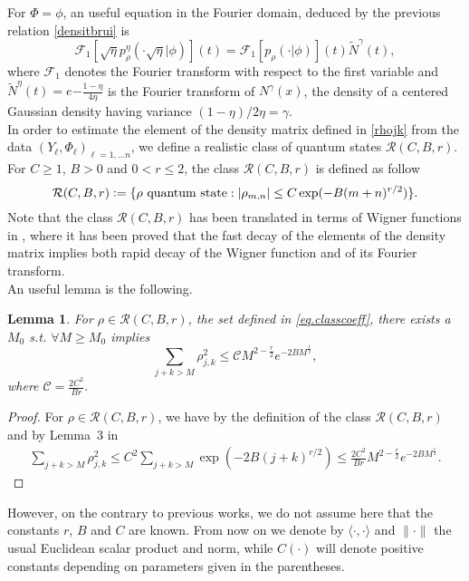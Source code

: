 \documentclass[a4paper]{amsart}
\newtheorem{lemma}{Lemma}[section]
\newcommand{\deq}{\mathrel{\mathop:} = } %
\begin{document}
For $\Phi=\phi$, an useful equation in the Fourier domain, deduced by 
the previous relation \eqref{densitbrui} is
       \begin{equation}
       \label{fourierproun}
       \mathcal{F}_1[\sqrt{\eta}p^\eta_\rho(\cdot\sqrt{\eta}|\phi)](t)
        = \mathcal{F}_1[p_\rho(\cdot|\phi)](t)
        \widetilde{N}^\gamma(t),
       \end{equation}
%       
where $\mathcal{F}_{1} $ denotes the Fourier transform with respect to the first
variable and  $\widetilde{N}^\eta(t)=e{-\frac{1-\eta}{4\eta}}$ is the Fourier
transform of $N^\gamma(x)$, the density of a centered Gaussian density having
variance $(1 -\eta)/2\eta=\gamma$.\\ 

In order  to estimate the element of the density matrix defined in \eqref{rhojk}
from the data  $(Y_{\ell}, \Phi_{\ell})_{\ell=1,\ldots n}$, we define a
realistic class of quantum states $\mathcal{R}(C,B,r)$. For $C\geq 1$, $B>0$ and
$0 < r \leq 2$, the class $\mathcal{R}(C,B,r)$ is defined as follow
%
          \begin{equation}\label{eq.classcoeff}
         \mathcal{R}(C,B,r) \deq \{\rho {\rm \ quantum \ state} :
        |\rho_{m,n} |\leq C \exp(-B (m+n)^{r/2})\}.
        \end{equation}
Note that the class  $\mathcal{R}(C,B,r)$ has been translated in terms of Wigner
functions in \cite{ABM}, where it has been proved that the fast decay of the
elements of the density matrix implies both rapid decay of the Wigner function
and of its Fourier transform.\\
An useful lemma is the following. 

\begin{lemma}
         \label{biais}
         For $\rho\in\mathcal{R}(C,B,r)$, the set defined in
\eqref{eq.classcoeff}, there exists a $M_0$ s.t. $\forall M\geq M_0$   implies
                    \begin{equation}
                     \label{Katia1}
                     \sum_{j+k> M}\rho_{j,k}^{2} \leq \mathcal{C}
M^{2-\frac{r}{2}} e^{-2BM^{\frac{r}{2}}},
                  \end{equation}
                     where $\mathcal{C}=\frac{2C^2}{Br}.$
\end{lemma}

\begin{proof}
For $\rho\in\mathcal{R}(C,B,r)$, we have by the definition of the class
$\mathcal{R}(C,B,r)$ and by Lemma~3 in \cite{ABM}
                  \begin{eqnarray*}
                  \sum_{j+k> M}\rho_{j,k}^{2}\leq C^2  \sum_{j+k> M}\exp(-2B
(j+k)^{r/2})\leq  \frac{2C^2}{Br} M^{2-\frac{r}{2}} e^{-2BM^{\frac{r}{2}}}.
                 \end{eqnarray*}
\end{proof}
However, on the contrary to previous works, we do not assume here that the
constants $r$, $B$ and $C$ are known. From now on we denote by $\langle \cdot,
\cdot \rangle$ and $\| \cdot \|$ the
usual Euclidean scalar product and norm, while $C(\cdot)$ will denote positive
constants depending on parameters given in the parentheses.
\end{document}
